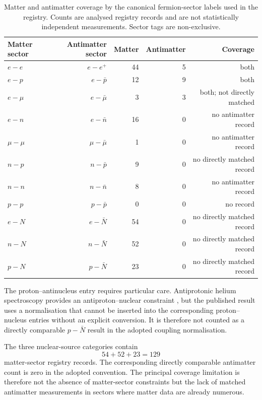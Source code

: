 \documentclass[aps,prd,reprint,superscriptaddress,nofootinbib]{revtex4-2}
\begin{document}
	\begin{table}[t]
		\caption{Matter and antimatter coverage by the canonical fermion-sector
			labels used in the registry. Counts are analysed registry records and
			are not statistically independent measurements. Sector tags are
			non-exclusive.}
		\label{tab:sectorcoverage}
		\begin{ruledtabular}
			\begin{tabular}{lrrrr}
				Matter sector & Antimatter sector & Matter & Antimatter
				& Coverage\\
				\hline
				$e-e$ & $e-e^+$ & 44 & 5 & both\\
				$e-p$ & $e-\bar p$ & 12 & 9 & both\\
				$e-\mu$ & $e-\bar\mu$ & 3 & 3 & both; not directly matched\\
				$e-n$ & $e-\bar n$ & 16 & 0 & no antimatter record\\
				$\mu-\mu$ & $\mu-\bar\mu$ & 1 & 0 & no antimatter record\\
				$n-p$ & $n-\bar p$ & 9 & 0 & no directly matched record\\
				$n-n$ & $n-\bar n$ & 8 & 0 & no antimatter record\\
				$p-p$ & $p-\bar p$ & 0 & 0 & no record\\
				$e-N$ & $e-\bar N$ & 54 & 0 & no directly matched record\\
				$n-N$ & $n-\bar N$ & 52 & 0 & no directly matched record\\
				$p-N$ & $p-\bar N$ & 23 & 0 & no directly matched record
			\end{tabular}
		\end{ruledtabular}
	\end{table}
	
	The proton--antinucleus entry requires particular care. Antiprotonic
	helium spectroscopy provides an antiproton--nuclear constraint
	\cite{Ficek2018}, but the published result uses a normalisation that
	cannot be inserted into the corresponding proton--nucleus entries
	without an explicit conversion. It is therefore not counted as a
	directly comparable $p-\bar N$ result in the adopted coupling
	normalisation.
	
	The three nuclear-source categories contain
	\begin{equation}
		54+52+23=129
	\end{equation}
	matter-sector registry records. The corresponding directly comparable
	antimatter count is zero in the adopted convention. The principal
	coverage limitation is therefore not the absence of matter-sector
	constraints but the lack of matched antimatter measurements in sectors
	where matter data are already numerous.
	
\end{document}
